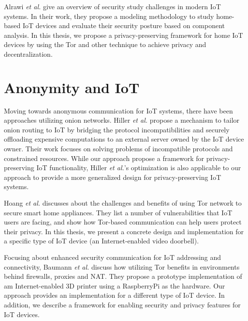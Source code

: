 Alrawi \textit{et al.} \cite{alrawi2019sok} give an overview of security study challenges in modern IoT systems. In their work, they propose a modeling methodology to study home-based IoT devices and evaluate their security posture based on component analysis. In this thesis, we propose a privacy-preserving framework for home IoT devices by using the Tor and other technique to achieve privacy and decentralization.



\section{Anonymity and IoT}

Moving towards anonymous communication for IoT systems, there have been approaches utilizing onion networks. Hiller \textit{et al.} \cite{hiller2019tailoring} propose a mechanism to tailor onion routing to IoT by bridging the protocol incompatibilities and securely offloading expensive computations to an external server owned by the IoT device owner. Their work focuses on solving problems of incompatible protocols and constrained resources. While our approach propose a framework for privacy-preserving IoT functionality, Hiller \textit{et al.}'s optimization is also applicable to our approach to provide a more generalized design for privacy-preserving IoT systems.

Hoang \textit{et al.} \cite{hoang2015tor} discusses about the challenges and benefits of using Tor network to secure smart home appliances. They list a number of vulnerabilities that IoT users are facing, and show how Tor-based communication can help users protect their privacy. In this thesis, we present a concrete design and implementation for a specific type of IoT device (an Internet-enabled video doorbell).

Focusing about enhanced security communication for IoT addressing and connectivity, Baumann \textit{et al.} \cite{baumann2018utilising} discuss how utilizing Tor benefits in environments behind firewalls, proxies and NAT. They propose a prototype implementation of am Internet-enabled 3D printer using a RaspberryPi as the hardware. Our approach provides an implementation for a different type of IoT device. In addition, we describe a framework for enabling security and privacy features for IoT devices.
